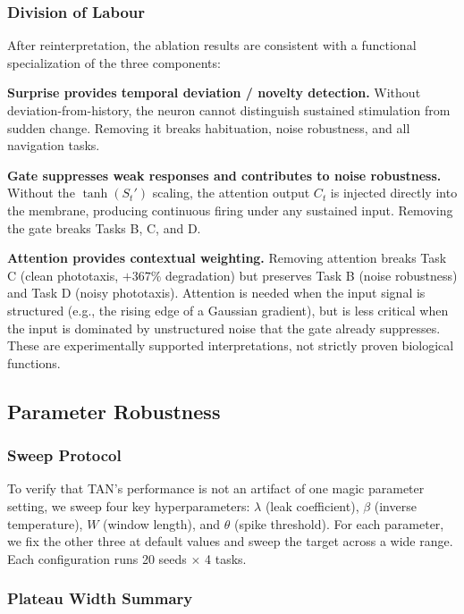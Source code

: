 \subsubsection{Division of Labour}

After reinterpretation, the ablation results are consistent with a functional specialization of the three components:

\textbf{Surprise provides temporal deviation / novelty detection.} Without deviation-from-history, the neuron cannot distinguish sustained stimulation from sudden change. Removing it breaks habituation, noise robustness, and all navigation tasks.

\textbf{Gate suppresses weak responses and contributes to noise robustness.} Without the $\tanh(S_t')$ scaling, the attention output $C_t$ is injected directly into the membrane, producing continuous firing under any sustained input. Removing the gate breaks Tasks B, C, and D.

\textbf{Attention provides contextual weighting.} Removing attention breaks Task C (clean phototaxis, $+367\%$ degradation) but preserves Task B (noise robustness) and Task D (noisy phototaxis). Attention is needed when the input signal is structured (e.g., the rising edge of a Gaussian gradient), but is less critical when the input is dominated by unstructured noise that the gate already suppresses. These are experimentally supported interpretations, not strictly proven biological functions.

\subsection{Parameter Robustness}

\subsubsection{Sweep Protocol}

To verify that TAN's performance is not an artifact of one magic parameter setting, we sweep four key hyperparameters: $\lambda$ (leak coefficient), $\beta$ (inverse temperature), $W$ (window length), and $\theta$ (spike threshold). For each parameter, we fix the other three at default values and sweep the target across a wide range. Each configuration runs 20 seeds $\times$ 4 tasks.

\subsubsection{Plateau Width Summary}

